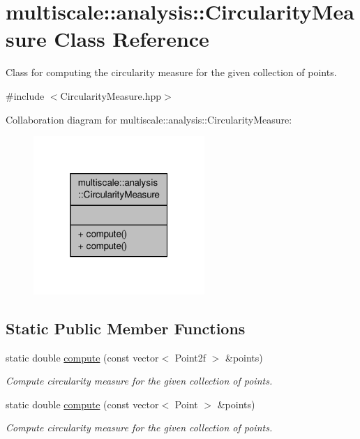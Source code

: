 \hypertarget{classmultiscale_1_1analysis_1_1CircularityMeasure}{\section{multiscale\-:\-:analysis\-:\-:Circularity\-Measure Class Reference}
\label{classmultiscale_1_1analysis_1_1CircularityMeasure}
}


Class for computing the circularity measure for the given collection of points.  




{\ttfamily \#include $<$Circularity\-Measure.\-hpp$>$}



Collaboration diagram for multiscale\-:\-:analysis\-:\-:Circularity\-Measure\-:\nopagebreak
\begin{figure}[H]
\begin{center}
\leavevmode
\includegraphics[width=184pt]{classmultiscale_1_1analysis_1_1CircularityMeasure__coll__graph}
\end{center}
\end{figure}
\subsection*{Static Public Member Functions}
\begin{DoxyCompactItemize}
\item 
static double \hyperlink{classmultiscale_1_1analysis_1_1CircularityMeasure_a819f1b1f9d7cdd96de2a6d9c5b6c6caa}{compute} (const vector$<$ Point2f $>$ \&points)
\begin{DoxyCompactList}\small\item\em Compute circularity measure for the given collection of points. \end{DoxyCompactList}\item 
static double \hyperlink{classmultiscale_1_1analysis_1_1CircularityMeasure_a252830f574cd4a85f108f74265520a8f}{compute} (const vector$<$ Point $>$ \&points)
\begin{DoxyCompactList}\small\item\em Compute circularity measure for the given collection of points. \end{DoxyCompactList}\end{DoxyCompactItemize}


